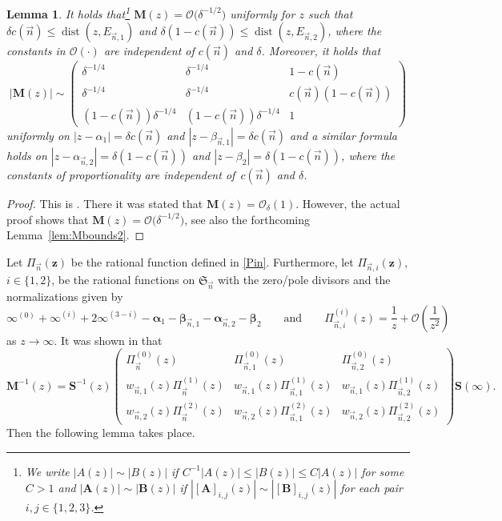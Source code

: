 \documentclass[10pt,a4paper]{amsart}
\numberwithin{equation}{section}
\newtheorem{Lemma}[Theorem]{Lemma}
\newcommand{\dist}{\operatorname{dist}}
\newcommand{\n}{{\vec n}}
\newcommand{\RS}{\boldsymbol{\mathfrak{S}}}
\newcommand{\z}	{{\boldsymbol z}}
\begin{document}
\begin{Lemma}
\label{lem:Mbounds1}
It holds that\footnote{We write $ |A(z)| \sim |B(z)| $ if $ C^{-1}|A(z)| \leq |B(z)| \leq C|A(z)| $ for some $ C>1 $ and $ |\boldsymbol A(z)| \sim |\boldsymbol B(z)| $ if $ |[\boldsymbol A]_{i,j}(z)| \sim |[\boldsymbol B]_{i,j}(z)| $ for each pair $ i,j\in\{1,2,3\} $.} $ \boldsymbol M(z) = \boldsymbol{\mathcal O}\bigl(\delta^{-1/2}\bigr) $ uniformly for $ z $ such that $ \delta c(\n) \leq \dist(z,E_{\n,1} ) $ and $ \delta(1-c(\n)) \leq \dist(z,E_{\n,2}) $, where the constants in $ \boldsymbol{\mathcal O}(\cdot) $ are independent of $ c(\n) $ and $ \delta $. Moreover, it holds that
\[
|\boldsymbol M(z)| \sim \begin{pmatrix} \delta^{-1/4} & \delta^{-1/4} & 1-c(\n) \\ \delta^{-1/4} & \delta^{-1/4} & c(\n)(1-c(\n)) \\ (1-c(\n))\delta^{-1/4} & (1-c(\n))\delta^{-1/4} & 1 \end{pmatrix}
\]
uniformly on $ |z-\alpha_1| = \delta c(\n) $ and $ |z-\beta_{\n,1}| = \delta c(\n) $ and a similar formula holds on $ |z-\alpha_{\n,2}| = \delta (1-c(\n)) $ and $ |z-\beta_2| = \delta (1-c(\n)) $, where the constants of proportionality are independent of~$ c(\n) $ and $ \delta $.
\end{Lemma}
\begin{proof}
This is \cite[Lemma~7.3]{ApDenYa21}. There it was stated that $ \boldsymbol M(z) = \boldsymbol{\mathcal O}_\delta(1) $. However, the actual proof shows that $ \boldsymbol M(z) = \boldsymbol{\mathcal O}\bigl(\delta^{-1/2}\bigr) $, see also the forthcoming Lemma~\ref{lem:Mbounds2}.
\end{proof}

Let $ \Pi_\n(\z) $ be the rational function defined in \eqref{Pin}. Furthermore, let $ \Pi_{\n,i}(\z) $, $ i\in\{1,2\} $, be the rational functions on $ \RS_\n $ with the zero/pole divisors and the normalizations given by
\begin{equation}
\label{Pini}
\infty^{(0)} + \infty^{(i)} +2 \infty^{(3-i)} - \boldsymbol\alpha_1 - \boldsymbol\beta_{\n,1} - \boldsymbol\alpha_{\n,2} - \boldsymbol\beta_2 \qquad \text{and}\qquad  \Pi_{\n,i}^{(i)}(z) = \frac1z + \mathcal O\left(\frac1{z^2}\right)
\end{equation}
as $ z\to\infty $. It was shown in \cite[equation~(7.7)]{ApDenYa21} that
\begin{equation}
\label{M-inverse}
\boldsymbol M^{-1}(z) = \boldsymbol S^{-1}(z) \begin{pmatrix} \Pi_\n^{(0)}(z) & \Pi_{\n,1}^{(0)}(z) & \Pi_{\n,2}^{(0)}(z) \\[1mm] w_{\n,1}(z)\Pi_\n^{(1)}(z) & w_{\n,1}(z)\Pi_{\n,1}^{(1)}(z) & w_{\n,1}(z)\Pi_{\n,2}^{(1)}(z) \\[1mm] w_{\n,2}(z)\Pi_\n^{(2)}(z) & w_{\n,2}(z)\Pi_{\n,1}^{(2)}(z) & w_{\n,2}(z)\Pi_{\n,2}^{(2)}(z) \end{pmatrix} \boldsymbol S(\infty).
\end{equation}
Then the following lemma takes place.
\end{document}

